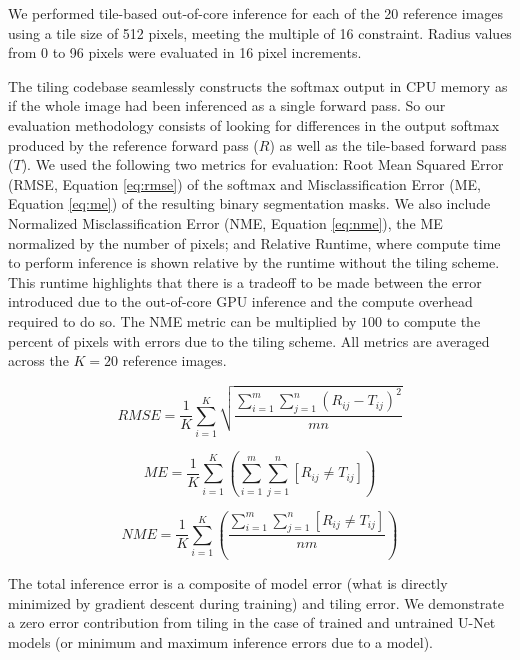 \documentclass[runningheads]{llncs}
\begin{document}
We performed tile-based out-of-core inference for each of the 20 reference images using a tile size of 512 pixels, meeting the multiple of 16 constraint. Radius values from 0 to 96 pixels were evaluated in 16 pixel increments. 

The tiling codebase seamlessly constructs the softmax output in CPU memory as if the whole image had been inferenced as a single forward pass. So our evaluation methodology consists of looking for differences in the output softmax produced by the reference forward pass ($R$) as well as the tile-based forward pass ($T$). We used the following two metrics for evaluation: Root Mean Squared Error (RMSE, Equation \ref{eq:rmse}) of the softmax and Misclassification Error (ME, Equation \ref{eq:me}) of the resulting binary segmentation masks. %
We also include Normalized Misclassification Error (NME, Equation \ref{eq:nme}), the ME normalized by the number of pixels; and Relative Runtime, where compute time to perform inference is shown relative by the runtime without the tiling scheme. This runtime highlights that there is a tradeoff to be made between the error introduced due to the out-of-core GPU inference and the compute overhead required to do so. The NME metric can be multiplied by $100$ to compute the percent of pixels with errors due to the tiling scheme.
All metrics are averaged across the $K = 20$ reference images.

\begin{equation}
RMSE = \frac{1}{K} \sum_{i=1}^{K} \sqrt{ \frac{\sum_{i = 1}^{m} \sum_{j = 1}^{n} (R_{ij} - T_{ij})^2}{mn}}
\label{eq:rmse}
\end{equation}

\begin{equation}
ME = \frac{1}{K} \sum_{i=1}^{K} \left( \sum_{i = 1}^{m} \sum_{j = 1}^{n} [ R_{ij} \neq T_{ij} ] \right) 
\label{eq:me}
\end{equation}

\begin{equation}
NME = \frac{1}{K} \sum_{i=1}^{K} \left( \frac{\sum_{i = 1}^{m} \sum_{j = 1}^{n} [ R_{ij} \neq T_{ij} ]}{nm} \right) 
\label{eq:nme}
\end{equation}

The total inference error is a composite of model error (what is directly minimized by gradient descent during training) and tiling error. We demonstrate a zero error contribution from tiling in the case of trained and untrained U-Net models (or minimum and maximum inference errors due to a model).
  
\end{document}
